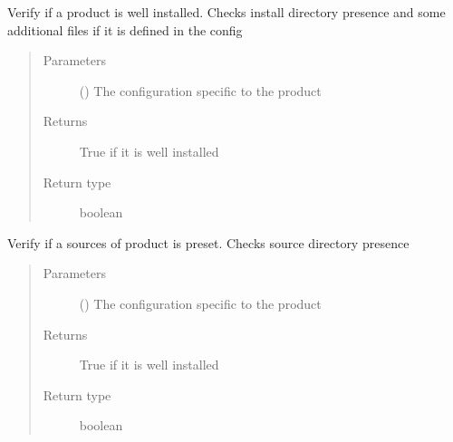 \documentclass[a4paper,10pt,english]{sphinxmanual}
\begin{document}
\begin{fulllineitems}
\label{\detokenize{commands/apidoc/src:src.product.check_installation}}
Verify if a product is well installed. Checks install directory presence
and some additional files if it is defined in the config
\begin{quote}\begin{description}
\item[{Parameters}] \leavevmode
{} () \textendash{} The configuration specific to 
the product

\item[{Returns}] \leavevmode
True if it is well installed

\item[{Return type}] \leavevmode
boolean

\end{description}\end{quote}

\end{fulllineitems}


\begin{fulllineitems}
\label{\detokenize{commands/apidoc/src:src.product.check_source}}
Verify if a sources of product is preset. Checks source directory presence
\begin{quote}\begin{description}
\item[{Parameters}] \leavevmode
{} () \textendash{} The configuration specific to 
the product

\item[{Returns}] \leavevmode
True if it is well installed

\item[{Return type}] \leavevmode
boolean

\end{description}\end{quote}

\end{fulllineitems}
\end{document}
